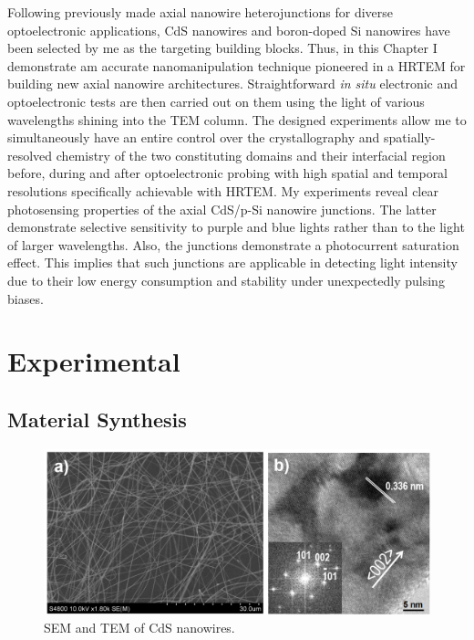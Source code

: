 Following previously made axial nanowire heterojunctions for diverse optoelectronic applications, CdS nanowires and boron-doped Si nanowires have been selected by me as the targeting building blocks. Thus, in this Chapter I demonstrate am accurate nanomanipulation technique pioneered  in a HRTEM for building new axial nanowire architectures. Straightforward \emph{in situ} electronic and optoelectronic tests are then carried out on them using the light of various wavelengths shining into the TEM column. The designed experiments allow me to simultaneously have an entire control over the crystallography and spatially-resolved chemistry of the two constituting domains and their interfacial region before, during and after optoelectronic probing with high spatial and temporal resolutions specifically achievable with HRTEM. 
My experiments reveal clear photosensing properties of the axial CdS/p-Si nanowire junctions. The latter demonstrate selective sensitivity to purple and blue lights rather than to the light of larger wavelengths. Also, the junctions demonstrate a photocurrent saturation effect. This implies that such junctions are applicable in detecting light intensity due to their low energy consumption and stability under unexpectedly pulsing biases. 

\section{Experimental}
\subsection{Material Synthesis}

\begin{figure}  
\includegraphics[width=\textwidth]{figures/figure3_s1}
\caption[SEM and TEM of CdS nanowires.]{SEM and TEM of CdS nanowires.
\label{fig:fig3_s1}}
\end{figure}

